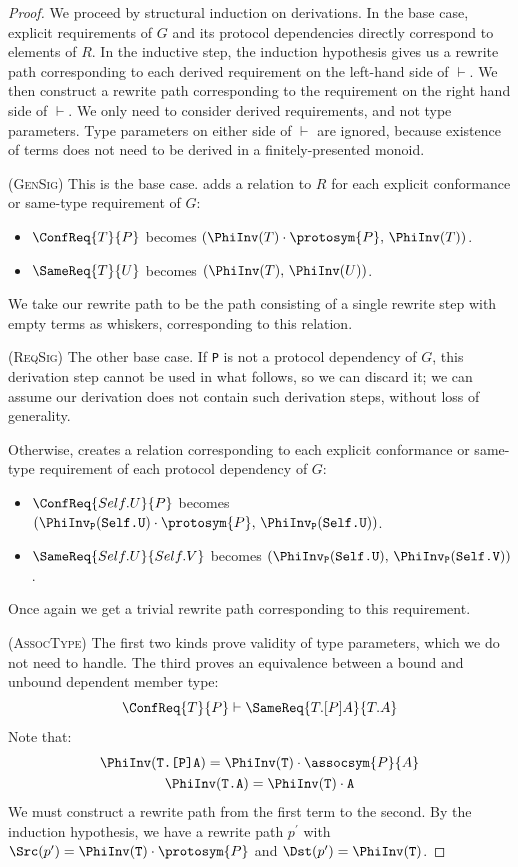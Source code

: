 \documentclass[../generics]{subfiles}
\begin{document}
\begin{proof}
We proceed by structural induction on derivations. In the base case, explicit requirements of $G$ and its protocol dependencies directly correspond to elements of $R$. In the inductive step, the induction hypothesis gives us a rewrite path corresponding to each derived requirement on the left-hand side of $\vdash$. We then construct a rewrite path corresponding to the requirement on the right hand side of $\vdash$. We only need to consider derived requirements, and not type parameters. Type parameters on either side of $\vdash$ are ignored, because existence of terms does not need to be derived in a finitely-presented monoid.

(\textsc{GenSig}) This is the base case.  adds a relation to $R$ for each explicit conformance or same-type requirement of $G$:
\begin{itemize}
\item $\ConfReq{T}{P}$ becomes $(\PhiInv(T)\cdot\protosym{P},\,\PhiInv(T))$.
\item $\SameReq{T}{U}$ becomes $(\PhiInv(T),\,\PhiInv(U))$.
\end{itemize}
We take our rewrite path to be the path consisting of a single rewrite step with empty terms as whiskers, corresponding to this relation.

(\textsc{ReqSig}) The other base case. If \texttt{P} is not a protocol dependency of $G$, this derivation step cannot be used in what follows, so we can discard it; we can assume our derivation does not contain such derivation steps, without loss of generality.

Otherwise,  creates a relation corresponding to each explicit conformance or same-type requirement of each protocol dependency of $G$:
\begin{itemize}
\item $\ConfReq{Self.U}{P}$ becomes $(\PhiInv_\texttt{P}(\texttt{Self.U})\cdot\protosym{P},\,\PhiInv_\texttt{P}(\texttt{Self.U}))$.
\item $\SameReq{Self.U}{Self.V}$ becomes $(\PhiInv_\texttt{P}(\texttt{Self.U}),\,\PhiInv_\texttt{P}(\texttt{Self.V}))$.
\end{itemize}
Once again we get a trivial rewrite path corresponding to this requirement.

(\textsc{AssocType})
The first two kinds prove validity of type parameters, which we do not need to handle. The third proves an equivalence between a bound and unbound dependent member type:
\[\ConfReq{T}{P}\vdash\SameReq{T.[P]A}{T.A}\]
Note that:
\begin{gather*}
\PhiInv(\texttt{T.[P]A})=\PhiInv(\texttt{T})\cdot\assocsym{P}{A}\\
\PhiInv(\texttt{T.A})=\PhiInv(\texttt{T})\cdot\texttt{A}
\end{gather*}
We must construct a rewrite path from the first term to the second. By the induction hypothesis, we have a rewrite path $p^\prime$ with $\Src(p^\prime)=\PhiInv(\texttt{T})\cdot\protosym{P}$ and $\Dst(p^\prime)=\PhiInv(\texttt{T})$.


\end{proof}
\end{document}
